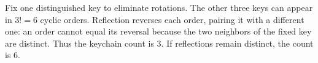 Fix one distinguished key to eliminate rotations. The other three keys can appear in $3!=6$ cyclic orders. Reflection reverses each order, pairing it with a different one: an order cannot equal its reversal because the two neighbors of the fixed key are distinct. Thus the keychain count is $\boxed3$. If reflections remain distinct, the count is $\boxed6$.

